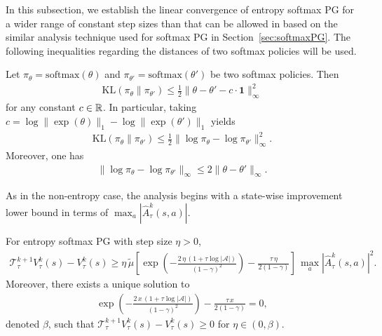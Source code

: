 In this subsection, we  establish the linear convergence of entropy softmax PG for a wider range of constant step sizes than that can be allowed in \cite{Mei_Xiao_Szepesvari_Schuurmans_2020} based on the similar analysis technique used for softmax PG in Section~\ref{sec:softmaxPG}. The following inequalities regarding the distances of two softmax policies will be used.
\begin{lemma}\label{lem:KL-softmax}
Let $\pi_\theta=\mathrm{softmax}(\theta)$ and $\pi_{\theta'}=\mathrm{softmax}(\theta')$ be two softmax policies. Then 
\begin{align*}
\mathrm{KL}(\pi_\theta\|\pi_{\theta'})\leq \frac{1}{2}\|\theta-\theta'-c\cdot \bm{1}\|_\infty^2
\end{align*}
for any constant $c\in\mathbb{R}$. In particular, taking $c=\log \|\exp(\theta)\|_1-\log \|\exp(\theta')\|_1$ yields 
\begin{align*}
\mathrm{KL}(\pi_\theta\|\pi_{\theta'})\leq \frac{1}{2}\|\log\pi_\theta-\log\pi_{\theta'}\|_\infty^2.
\end{align*}
Moreover, one has
\begin{align*}
\|\log\pi_\theta-\log\pi_{\theta'}\|_\infty\leq 2\|\theta-\theta'\|_\infty.
\end{align*}
\end{lemma}
As in the non-entropy case, the analysis begins with a state-wise improvement lower bound in terms of $\max_a|\hat{A}_\tau^k(s,a)|$.
\begin{lemma}\label{lem:entropy-lower-bound}
    For entropy softmax PG with step size $\eta>0$,
\begin{align*}
\mathcal{T}_\tau^{k+1}V_\tau^k(s)-V_\tau^k(s)\geq \eta\,\tilde{\mu}\left[\exp\left(-\frac{2\,\eta\,(1+\tau\log|\mathcal{A}|)}{(1-\gamma)^2}\right)-\frac{\tau\,\eta}{2(1-\gamma)}\right]\,\max_a|\hat{A}_\tau^k(s,a)|^2.
\end{align*}
Moreover, there exists a unique solution to 
\begin{align*}
    \exp\left(-\frac{2\,x\,(1+\tau\log|\mathcal{A}|)}{(1-\gamma)^2}\right)-\frac{\tau\,x}{2(1-\gamma)}=0,
\end{align*}
denoted $\beta$, such that $\mathcal{T}_\tau^{k+1}V_\tau^k(s)-V_\tau^k(s)\geq 0$ for $\eta\in(0,\beta)$.
\end{lemma}
